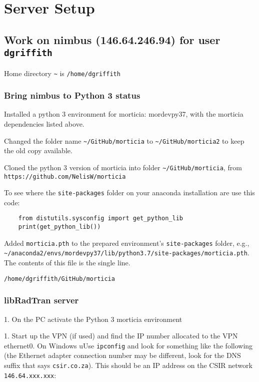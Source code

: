 

\chapter{Server Setup}
\label{chap:ServerSetup}



\section{Work on nimbus (146.64.246.94) for user \lstinline{dgriffith}}

Home directory \lstinline{~} is \lstinline{/home/dgriffith}

\subsection{Bring nimbus to Python 3 status}

Installed a python 3 environment for morticia: mordevpy37, with the morticia dependencies listed above.

Changed the folder name  \lstinline{~/GitHub/morticia} to \lstinline{~/GitHub/morticia2} to keep the old copy available.

Cloned the python 3 version of morticia into folder \lstinline{~/GitHub/morticia}, from \lstinline{https://github.com/NelisW/morticia}

To see where the \lstinline{site-packages} folder on your anaconda installation are use this code:

\begin{lstlisting}
    from distutils.sysconfig import get_python_lib
    print(get_python_lib())

\end{lstlisting}
Added \lstinline{morticia.pth} to the prepared environment's \lstinline{site-packages} folder, e.g.,  \lstinline{~/anaconda2/envs/mordevpy37/lib/python3.7/site-packages/morticia.pth}. The contents of this file is the single line. 

    \lstinline{/home/dgriffith/GitHub/morticia}


\subsection{libRadTran server}

1. On the PC activate the Python 3 morticia environment 

1. Start up the VPN (if used) and find the IP number allocated to the VPN ethernet0. On Windows uUse \lstinline{ipconfig} and look for something like the following (the Ethernet adapter connection number may be different, look for the DNS suffix that says \lstinline{csir.co.za}). This should be an IP address on the CSIR network \lstinline{146.64.xxx.xxx}:

